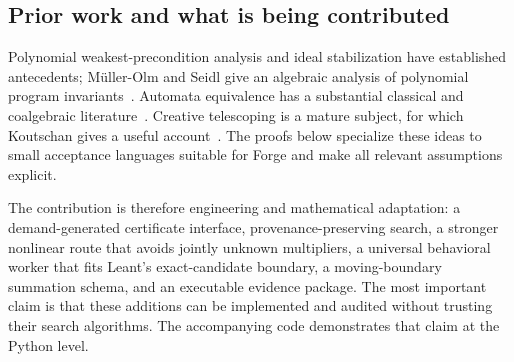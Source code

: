 \subsection{Prior work and what is being contributed}

Polynomial weakest-precondition analysis and ideal stabilization have established antecedents; M\"uller-Olm and Seidl give an algebraic analysis of polynomial program invariants~\cite{mueller-seidl}. Automata equivalence has a substantial classical and coalgebraic literature~\cite{automata-equivalence}. Creative telescoping is a mature subject, for which Koutschan gives a useful account~\cite{koutschan}. The proofs below specialize these ideas to small acceptance languages suitable for Forge and make all relevant assumptions explicit.

The contribution is therefore engineering and mathematical adaptation: a demand-generated certificate interface, provenance-preserving search, a stronger nonlinear route that avoids jointly unknown multipliers, a universal behavioral worker that fits Leant's exact-candidate boundary, a moving-boundary summation schema, and an executable evidence package. The most important claim is that these additions can be implemented and audited without trusting their search algorithms. The accompanying code demonstrates that claim at the Python level.
